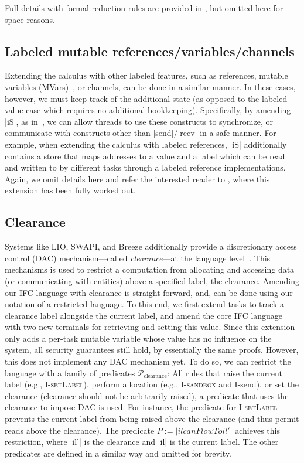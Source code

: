 Full details with formal reduction rules are provided
in \appendixextfirst{}, but omitted here for space reasons.

\subsection{Labeled mutable references/variables/channels}
%
Extending the calculus with other labeled features, such as
references, mutable variables (MVars)~\cite{CH96}, or channels,
can be done in a similar manner.
%
In these cases, however, we must keep track of the additional state
(as opposed to the labeled value case which requires no additional
bookkeeping).
%
%
Specifically, by amending |iS|, as in~\cite{lio,
stefan:addressing-covert}, we can allow threads to use these
constructs to synchronize, or communicate with constructs other than
|send|/|recv| in a safe manner.
%
For example, when extending the calculus with labeled references, |iS|
additionally contains a store that maps addresses to a value
and a label
which can be read and written to by different tasks through a labeled
reference implementations.
Again, we omit details here and refer the interested reader
to \appendixext{}, where this extension has been fully worked out.

\subsection{Clearance}
%
Systems like LIO, SWAPI, and Breeze additionally provide a discretionary access
control (DAC) mechanism---called \emph{clearance}---at the language
level~\cite{Hritcu:2013:YIB:2497621.2498098, lio}.
%
This mechanisms is used to restrict a computation from allocating and
accessing data (or communicating with entities) above a specified
label, the clearance.
%
Amending our IFC language with clearance is straight forward,
and, can be done using our notation of a restricted language.
%
To this end, we first extend tasks to track a clearance label
alongside the current label, and amend the core IFC language with two
new terminals for retrieving and setting this value.
%
Since this extension only adds a per-task mutable variable whose value
has no influence on the system, all security guarantees still
hold, by essentially the same proofs.
%
However, this does not implement any DAC mechanism yet.
%
To do so, we can restrict the language with a family of predicates
$\mathcal{P}_\text{clearance}$:
All rules that
raise the current label (e.g., \textsc{I-setLabel}), perform
allocation (e.g., \textsc{I-sandbox} and \textsf{I-send}), or set the
clearance (clearance should not be arbitrarily raised), a predicate
that uses the clearance to impose DAC is used.
%
For instance, the predicate for \textsc{I-setLabel} prevents the
current label from being raised above the clearance (and thus permit
reads above the clearance).  The predicate $P := |il
canFlowTo il'|$ achieves this restriction, where |il'| is the
clearance and |il| is the current
label.
%
The other predicates are defined in a similar way and omitted for
brevity.

